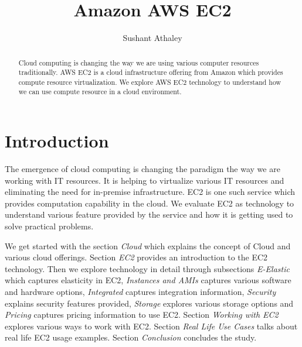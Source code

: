 

\title{Amazon AWS EC2}


\author{Sushant Athaley}

\renewcommand{\shortauthors}{G. v. Laszewski}


\begin{abstract}
Cloud computing is changing the way we are using various computer resources traditionally. AWS EC2 is a cloud infrastructure offering from Amazon which provides compute resource virtualization. We explore AWS EC2 technology to understand how we can use compute resource in a cloud environment. 

\end{abstract}


\maketitle

\section{Introduction}
The emergence of cloud computing is changing the paradigm the way we are working with IT resources. It is helping to virtualize various IT resources and eliminating the need for in-premise infrastructure. EC2 is one such service which provides computation capability in the cloud. We evaluate EC2 as technology to understand various feature provided by the service and how it is getting used to solve practical problems.

We get started with the section \emph{Cloud} which explains the concept of Cloud and various cloud offerings. Section \emph{EC2} provides an introduction to the EC2 technology. Then we explore technology in detail through subsections \emph{E-Elastic} which captures elasticity in EC2, \emph{Instances and AMIs} captures various software and hardware options, \emph{Integrated} captures integration information, \emph{Security} explains security features provided, \emph{Storage} explores various storage options and \emph{Pricing} captures pricing information to use EC2.
Section \emph{Working with EC2} explores various ways to work with EC2. Section \emph{Real Life Use Cases} talks about real life EC2 usage examples. Section \emph{Conclusion} concludes the study. 

